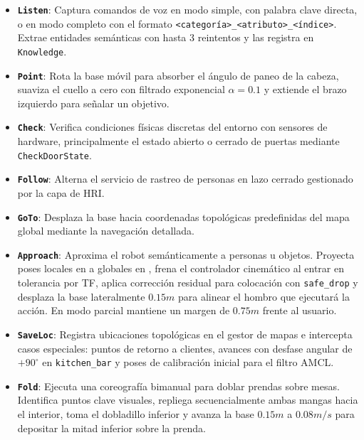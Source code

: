 \begin{itemize}
    \item \textbf{\texttt{Listen}}: Captura comandos de voz en modo simple, con palabra clave directa, o en modo completo con el formato \texttt{<categoría>\_<atributo>\_<índice>}. Extrae entidades semánticas con hasta 3 reintentos y las registra en \texttt{Knowledge}.

    \item \textbf{\texttt{Point}}: Rota la base móvil para absorber el ángulo de paneo de la cabeza, suaviza el cuello a cero con filtrado exponencial $\alpha = 0.1$ y extiende el brazo izquierdo para señalar un objetivo.

    \item \textbf{\texttt{Check}}: Verifica condiciones físicas discretas del entorno con sensores de hardware, principalmente el estado abierto o cerrado de puertas mediante \texttt{CheckDoorState}.

    \item \textbf{\texttt{Follow}}: Alterna el servicio de rastreo de personas en lazo cerrado gestionado por la capa de HRI.

    \item \textbf{\texttt{GoTo}}: Desplaza la base hacia coordenadas topológicas predefinidas del mapa global mediante la navegación detallada.

    \item \textbf{\texttt{Approach}}: Aproxima el robot semánticamente a personas u objetos. Proyecta poses locales en  a globales en , frena el controlador cinemático al entrar en tolerancia por TF, aplica corrección residual para colocación con \texttt{safe\_drop} y desplaza la base lateralmente $0.15m$ para alinear el hombro que ejecutará la acción. En modo parcial mantiene un margen de $0.75m$ frente al usuario.

    \item \textbf{\texttt{SaveLoc}}: Registra ubicaciones topológicas en el gestor de mapas e intercepta casos especiales: puntos de retorno a clientes, avances con desfase angular de $+90^\circ$ en \texttt{kitchen\_bar} y poses de calibración inicial para el filtro AMCL.

    \item \textbf{\texttt{Fold}}: Ejecuta una coreografía bimanual para doblar prendas sobre mesas. Identifica puntos clave visuales, repliega secuencialmente ambas mangas hacia el interior, toma el dobladillo inferior y avanza la base $0.15m$ a $0.08m/s$ para depositar la mitad inferior sobre la prenda.
\end{itemize}

